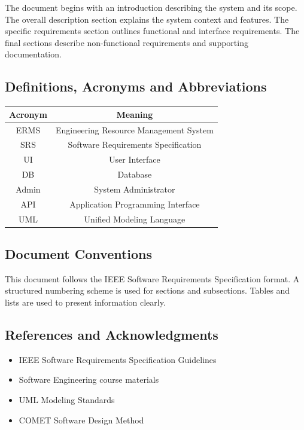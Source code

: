 \documentclass[12pt]{article}
\begin{document}
The document begins with an introduction describing the system and its scope. The overall description section explains the system context and features. The specific requirements section outlines functional and interface requirements. The final sections describe non-functional requirements and supporting documentation.

\subsection{Definitions, Acronyms and Abbreviations}

\begin{center}
\begin{tabular}{|c|c|}
\hline
Acronym & Meaning \\
\hline
ERMS & Engineering Resource Management System \\
SRS & Software Requirements Specification \\
UI & User Interface \\
DB & Database \\
Admin & System Administrator \\
API & Application Programming Interface \\
UML & Unified Modeling Language \\
\hline
\end{tabular}
\end{center}

\subsection{Document Conventions}

This document follows the IEEE Software Requirements Specification format. A structured numbering scheme is used for sections and subsections. Tables and lists are used to present information clearly.

\subsection{References and Acknowledgments}

\begin{itemize}
\item IEEE Software Requirements Specification Guidelines
\item Software Engineering course materials
\item UML Modeling Standards
\item COMET Software Design Method
\end{itemize}
\end{document}
